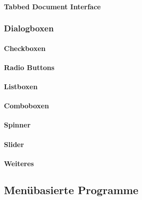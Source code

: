 \documentclass[a4paper, 11pt, accentcolor = tud3b]{tudreport}
\begin{document}
					\paragraph{Tabbed Document Interface} %

				\subsubsection{Dialogboxen} %

					\paragraph{Checkboxen} %

					\paragraph{Radio Buttons} %

					\paragraph{Listboxen} %

					\paragraph{Comboboxen} %

					\paragraph{Spinner} %

					\paragraph{Slider} %

					\paragraph{Weiteres} %

			\subsection{Menübasierte Programme} %
\end{document}
